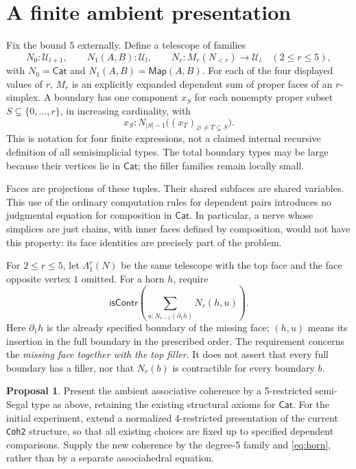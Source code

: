 \documentclass[11pt]{amsart}
\newcommand{\Cat}{\mathsf{Cat}}
\newcommand{\Map}{\mathsf{Map}}
\newcommand{\isContr}{\mathsf{isContr}}
\newcommand{\code}[1]{\nolinkurl{#1}}
\theoremstyle{definition}
\newtheorem{proposal}{Proposal}
\begin{document}
\section{A finite ambient presentation}

Fix the bound $5$ externally. Define a telescope of families
\[
 N_0:\mathcal U_{l+1},\qquad
 N_1(A,B):\mathcal U_l,\qquad
 N_r:M_r(N_{<r})\to\mathcal U_l\quad(2\leq r\leq5),
\]
with $N_0=\Cat$ and $N_1(A,B)=\Map(A,B)$.
For each of the four displayed values of $r$, $M_r$ is an explicitly
expanded dependent sum of proper faces of an $r$-simplex. A boundary
has one component $x_S$ for each nonempty proper subset
$S\subsetneq\{0,\ldots,r\}$, in increasing cardinality, with
\[
 x_S:N_{|S|-1}\bigl((x_T)_{\varnothing\ne T\subsetneq S}\bigr).
\]
This is notation for four finite expressions, not a claimed internal
recursive definition of all semisimplicial types. The total boundary
types may be large because their vertices lie in $\Cat$; the filler
families remain locally small.

Faces are projections of these tuples. Their shared subfaces are shared
variables. This use of the ordinary computation rules for dependent
pairs introduces no judgmental equation for composition in $\Cat$.
In particular, a nerve whose simplices are just chains, with inner faces
defined by composition, would not have this property: its face identities
are precisely part of the problem.

For $2\leq r\leq5$, let $\Lambda^r_1(N)$ be the same telescope with the
top face and the face opposite vertex $1$ omitted. For a horn $h$, require
\begin{equation}\label{eq:horn}
 \isContr\left(
   \sum_{u:N_{r-1}(\partial_1h)}N_r(h,u)\right).
\end{equation}
Here $\partial_1h$ is the already specified boundary of the missing face;
$(h,u)$ means its insertion in the full boundary in the prescribed order.
The requirement concerns the \emph{missing face together with the top
filler}. It does not assert that every full boundary has a filler, nor
that $N_r(b)$ is contractible for every boundary $b$.

\begin{proposal}\label{prop:proposal}
Present the ambient associative coherence by a 5-restricted semi-Segal
type as above, retaining the existing structural axioms for $\Cat$.
For the initial experiment, extend a normalized 4-restricted presentation
of the current \code{Coh2} structure, so that all existing choices are
fixed up to specified dependent comparisons. Supply the new coherence
by the degree-5 family and \eqref{eq:horn}, rather than by a separate
associahedral equation.
\end{proposal}
\end{document}
